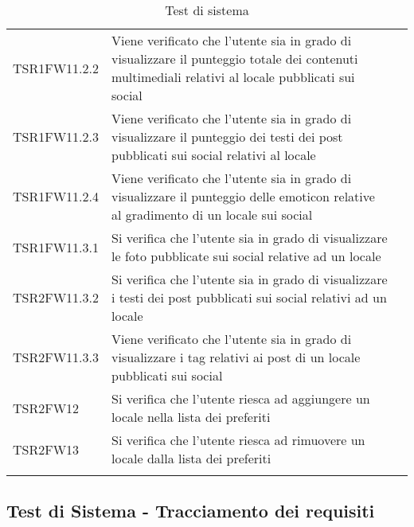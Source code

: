 \begin{longtable}{ m{}<{\centering}  m{}<{\centering}  m{}<{\centering} }
	TSR1FW11.2.2	& Viene verificato che l'utente sia in grado di visualizzare il punteggio totale dei contenuti multimediali relativi al locale pubblicati sui social & \Su \\
	TSR1FW11.2.3	& Viene verificato che l'utente sia in grado di visualizzare il punteggio dei testi dei post pubblicati sui social relativi al locale & \Su \\
	TSR1FW11.2.4	& Viene verificato che l'utente sia in grado di visualizzare il punteggio delle emoticon relative al gradimento di un locale sui social & \Su \\
	TSR1FW11.3.1	& Si verifica che l'utente sia in grado di visualizzare le foto pubblicate sui social relative ad un locale & \Su \\
	TSR2FW11.3.2	& Si verifica che l'utente sia in grado di visualizzare i testi dei post pubblicati sui social relativi ad un locale & \Su \\
	TSR2FW11.3.3	& Viene verificato che l'utente sia in grado di visualizzare i tag relativi ai post di un locale pubblicati sui social & \Su \\
	TSR2FW12 & Si verifica che l'utente riesca ad aggiungere un locale nella lista dei preferiti & \Su \\
	TSR2FW13 & Si verifica che l'utente riesca ad rimuovere un locale dalla lista dei preferiti & \Su \\
	
    \caption{Test di sistema}
\end{longtable}	

\subsection{Test di Sistema - Tracciamento dei requisiti}


